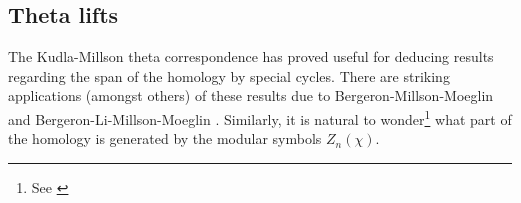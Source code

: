 \documentclass[a4paper,11pt]{amsart} %
\newcommand{\8}{\infty}
\newcommand{\vbf}{\mathbf{v}}
\newcommand{\four}{\pazocal{F}}
\newcommand{\SO}{\mathrm{SO}}
\newcommand{\SL}{\mathrm{SL}}
\newcommand{\GL}{\mathrm{GL}}
\newcommand{\HH}{\mathbb{H}}
\newcommand{\R}{\mathbb{R}}
\newcommand{\C}{\mathbb{C}}
\newcommand{\End}{\mathrm{End}}
\newcommand{\re}{\mathrm{Re}}
\theoremstyle{mytheoremstyle}
\newtheorem{thm}{Theorem}[section]
\theoremstyle{remark}
\numberwithin{equation}{section}
\begin{document}
%

\subsection{Theta lifts} The Kudla-Millson theta correspondence has proved useful for deducing results regarding the span of the homology by special cycles. There are striking applications (amongst others) of these results due to Bergeron-Millson-Moeglin \cite{bmm} and Bergeron-Li-Millson-Moeglin \cite{blmm}. Similarly, it is natural to wonder\footnote{See \cite[Question~(a), p.~2]{mazur}} what part of the homology is generated by the modular symbols $Z_n(\chi)$.
\end{document}
